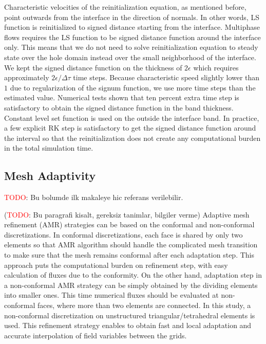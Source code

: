 \documentclass[11pt,a4paper,twoside]{article}
\begin{document}
	Characteristic velocities of the reinitialization equation, as mentioned before,  point outwards from the interface in the direction of normals. In other words, LS function is reinitialized to signed distance  starting from the interface. Multiphase flows requires the LS function to be signed distance function around the interface only. This means that we do not need to solve reinitialization equation to steady state over the hole domain instead  over the small neighborhood of the interface. We kept the  signed distance function on the thickness of $2\epsilon $ which requires  approximately $ 2\epsilon/\Delta \tau $ time steps. Because characteristic speed slightly lower than $ 1 $ due to regularization of the signum function, we use more time steps than the estimated value. Numerical tests shown that ten percent extra time step is satisfactory to obtain the signed distance function in the band thickness. Constant level set function is used on the outside the interface band. In practice, a few explicit RK step is satisfactory to get the signed distance function around the interval so that the reinitialization  does not create any computational burden in the total simulation time.               
	
	
	\subsection{Mesh Adaptivity}
	\label{Sec.MeshAdaptivity}
	
	\textcolor{red}{TODO}: Bu bolumde ilk makaleye hic referans verilebilir.
	
	(\textcolor{red}{TODO}: Bu paragrafi kisalt, gereksiz tanimlar, bilgiler verme) Adaptive mesh refinement (AMR) strategies can be based on the conformal and non-conformal discretizations. In conformal discretizations, each face is shared by only two elements so that AMR algorithm should handle the complicated mesh transition to make sure that the mesh remains conformal after each adaptation step. This approach puts the computational burden on refinement step, with easy calculation of fluxes due to the conformity. On the other hand, adaptation step in a non-conformal AMR strategy can be simply obtained by the dividing elements into smaller ones. This time numerical fluxes should be evaluated at non-conformal faces, where more than two elements are connected. In this study, a non-conformal discretization on unstructured triangular/tetrahedral elements is used. This refinement strategy enables to obtain fast and local adaptation and  accurate interpolation of field variables between the grids. 
	
\end{document}
